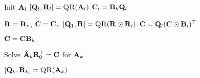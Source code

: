 \begin{algorithmic}[1]
        \State Init $\mathbf{A}_l$
        \State $[\mat{Q}_l,\mat{R}_l] = \Call{QR}{\mat{A}_l}$ 
        \State $\mathbf{C}_l = \mathbf{B}_k\mathbf{Q}_l$   \label{l:Pair-K-Apply}
      \EndFor
      
        
        \State $\mathbf{R} = \mathbf{R}_z$, $\mathbf{C} = \mathbf{C}_z$ 
         
            \State $[\mat{Q}_1,\mat{R}] = \Call{QR}{\mat{R} \odot \mat{R}_i}$ \label{l:pair-QR-R}
            \State $\mathbf{C} = \mathbf{Q}_l(\mathbf{C} \odot \mathbf{B}_i)^\top$
          
          \EndIf
        
        \EndFor
        \State $\mathbf{C} = \mathbf{C}\mathbf{B}_k$
              
      \State Solve $  \mathbf{\hat{A}}_k\mathbf{R}_0^\top = \mathbf{C}$ for $\mathbf{A}_k$ 
      
      \State $[\mat{Q}_k,\mat{R}_k] = \Call{QR}{\mat{A}_k}$    
      \EndFor
      \EndWhile
    \EndFunction
  \end{algorithmic}